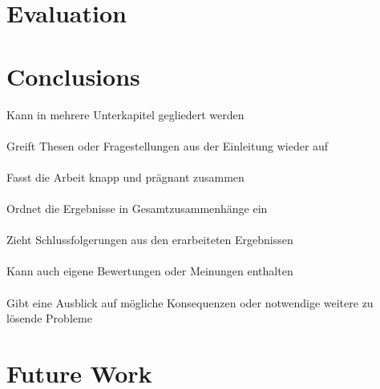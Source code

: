 \documentclass[a4paper,10pt]{scrreprt}
\begin{document}
\chapter{Evaluation}
\chapter{Conclusions}
Kann in mehrere Unterkapitel gegliedert werden\\\\
Greift Thesen oder Fragestellungen aus der Einleitung wieder auf\\\\
Fasst die Arbeit knapp und prägnant zusammen\\\\
Ordnet die Ergebnisse in Gesamtzusammenhänge ein\\\\
Zieht Schlussfolgerungen aus den erarbeiteten Ergebnissen\\\\
Kann auch eigene Bewertungen oder Meinungen enthalten\\\\
Gibt eine Ausblick auf mögliche Konsequenzen oder notwendige weitere zu lösende Probleme
\chapter{Future Work}
\end{document}
